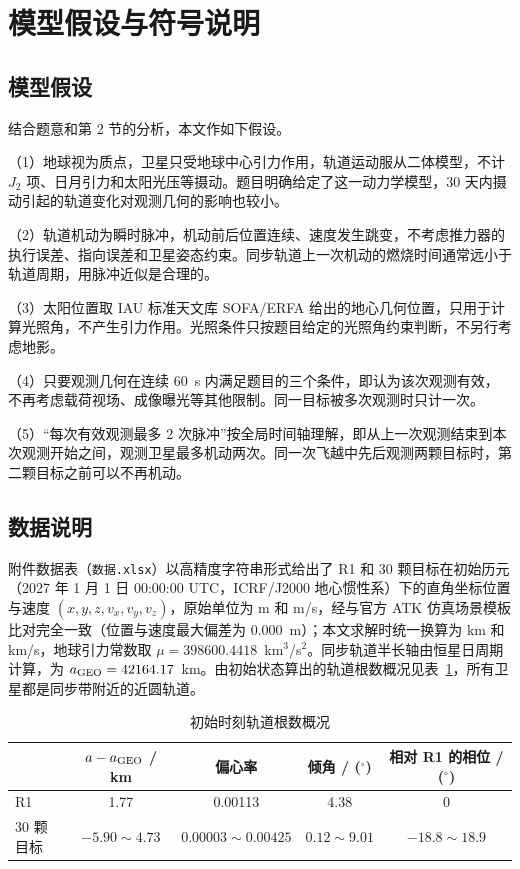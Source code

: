 \section{模型假设与符号说明}

\subsection{模型假设}

结合题意和第 2 节的分析，本文作如下假设。

（1）地球视为质点，卫星只受地球中心引力作用，轨道运动服从二体模型，不计 $J_2$ 项、日月引力和太阳光压等摄动。题目明确给定了这一动力学模型，30 天内摄动引起的轨道变化对观测几何的影响也较小。

（2）轨道机动为瞬时脉冲，机动前后位置连续、速度发生跳变，不考虑推力器的执行误差、指向误差和卫星姿态约束。同步轨道上一次机动的燃烧时间通常远小于轨道周期，用脉冲近似是合理的。

（3）太阳位置取 IAU 标准天文库 SOFA/ERFA\cite{sofa} 给出的地心几何位置，只用于计算光照角，不产生引力作用。光照条件只按题目给定的光照角约束判断，不另行考虑地影。

（4）只要观测几何在连续 60~s 内满足题目的三个条件，即认为该次观测有效，不再考虑载荷视场、成像曝光等其他限制。同一目标被多次观测时只计一次。

（5）“每次有效观测最多 2 次脉冲”按全局时间轴理解，即从上一次观测结束到本次观测开始之间，观测卫星最多机动两次。同一次飞越中先后观测两颗目标时，第二颗目标之前可以不再机动。

\subsection{数据说明}

附件数据表（\texttt{数据.xlsx}）以高精度字符串形式给出了 R1 和 30 颗目标在初始历元（2027 年 1 月 1 日 00:00:00 UTC，ICRF/J2000 地心惯性系）下的直角坐标位置与速度 $(x, y, z, v_x, v_y, v_z)$，原始单位为 m 和 m/s，经与官方 ATK 仿真场景模板比对完全一致（位置与速度最大偏差为 $0.000$~m）；本文求解时统一换算为 km 和 km/s，地球引力常数取 $\mu = 398600.4418$~km$^3$/s$^2$。同步轨道半长轴由恒星日周期计算，为 $a_{\mathrm{GEO}} = 42164.17$~km。由初始状态算出的轨道根数概况见表~\ref{tab:elements}，所有卫星都是同步带附近的近圆轨道。

\begin{table}[!htb]
  \centering
  \caption{初始时刻轨道根数概况}
  \label{tab:elements}
  \begin{tabular}{lcccc}
    \toprule
     & $a-a_{\mathrm{GEO}}$ / km & 偏心率 & 倾角 / ($^\circ$) & 相对 R1 的相位 / ($^\circ$) \\
    \midrule
    R1 & 1.77 & 0.00113 & 4.38 & 0 \\
    30 颗目标 & $-5.90 \sim 4.73$ & $0.00003 \sim 0.00425$ & $0.12 \sim 9.01$ & $-18.8 \sim 18.9$ \\
    \bottomrule
  \end{tabular}
\end{table}

